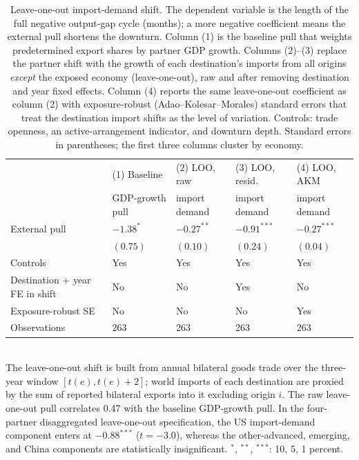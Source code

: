 \begin{table}[H]
\centering\small
\caption{Leave-one-out import-demand shift. The dependent variable is the length of the full negative output-gap cycle (months); a more negative coefficient means the external pull shortens the downturn. Column (1) is the baseline pull that weights predetermined export shares by partner GDP growth. Columns (2)--(3) replace the partner shift with the growth of each destination's imports from all origins \emph{except} the exposed economy (leave-one-out), raw and after removing destination and year fixed effects. Column (4) reports the same leave-one-out coefficient as column (2) with exposure-robust (Adao--Kolesar--Morales) standard errors that treat the destination import shifts as the level of variation. Controls: trade openness, an active-arrangement indicator, and downturn depth. Standard errors in parentheses; the first three columns cluster by economy.}
\label{tab:loo}
\begin{tabularx}{\textwidth}{@{}lYYYY@{}}
\toprule
& (1) Baseline & (2) LOO, raw & (3) LOO, resid. & (4) LOO, AKM \\
& GDP-growth pull & import demand & import demand & import demand \\ \midrule
External pull & $-1.38^{*}$ & $-0.27^{**}$ & $-0.91^{***}$ & $-0.27^{***}$ \\
 & {\scriptsize$(0.75)$} & {\scriptsize$(0.10)$} & {\scriptsize$(0.24)$} & {\scriptsize$(0.04)$} \\
\midrule
Controls & Yes & Yes & Yes & Yes \\
Destination + year FE in shift & No & No & Yes & No \\
Exposure-robust SE & No & No & No & Yes \\
Observations & 263 & 263 & 263 & 263 \\
\bottomrule
\end{tabularx}
\\[2pt]\footnotesize{The leave-one-out shift is built from annual bilateral goods trade over the three-year window $[t(e),t(e)+2]$; world imports of each destination are proxied by the sum of reported bilateral exports into it excluding origin $i$. The raw leave-one-out pull correlates 0.47 with the baseline GDP-growth pull. In the four-partner disaggregated leave-one-out specification, the US import-demand component enters at $-0.88^{***}$ ($t=-3.0$), whereas the other-advanced, emerging, and China components are statistically insignificant. $^{*}$, $^{**}$, $^{***}$: 10, 5, 1 percent.}
\end{table}
